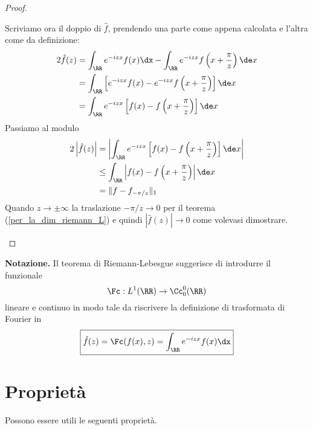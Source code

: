 \begin{proof}
\begin{enumerate}
    Scriviamo ora il doppio di $\hat{f}$, prendendo una parte come appena calcolata e l'altra come da definizione:
    \begin{align*}
    2\hat{f}(z) & = \int_{\RR} e^{- izx} f(x) \dx - \int_{\RR} e^{- izx} f\left(x + \frac{\pi}{z}\right) \de x\\
     & = \int_{\RR}\left[e^{- izx} f(x) - e^{- izx} f\left(x + \frac{\pi}{z}\right)\right] \de x\\
     & = \int_{\RR} e^{- izx}\left[f(x) - f\left(x + \frac{\pi}{z}\right)\right] \de x
    \end{align*}
    Passiamo al modulo
    \begin{align*}
    2\left| \hat{f}(z)\right| & =\left| \int_{\RR} e^{- izx}\left[f(x) - f\left(x + \frac{\pi}{z}\right)\right] \de x\right|\\
     & \leq \int_{\RR}\left| f(x) - f\left(x + \frac{\pi}{z}\right)\right| \de x\\
     & = \Vert f - f_{- \pi /z} \Vert_{1}
    \end{align*}
    Quando $z\rightarrow \pm \infty $ la traslazione $ - \pi /z\rightarrow 0$ per il teorema (\ref{per_la_dim_riemann_L}) e quindi $\left| \hat{f}(z)\right| \rightarrow 0$ come volevasi dimostrare.
\end{enumerate}
\end{proof}

\textbf{Notazione.} Il teorema di Riemann-Lebesgue suggerisce di introdurre il funzionale
\begin{equation*}
\Fc : L^{1}(\RR)\rightarrow \Cc^{0}_{0}(\RR)
\end{equation*}
lineare e continuo in modo tale da riscrivere la definizione di trasformata di Fourier in
\begin{equation*}
\boxed{\hat{f}(z)=\Fc(f(x),z)=\int_\RR e^{-izx}f(x)\dx}
\end{equation*}


\section{Proprietà}

Possono essere utili le seguenti proprietà.

